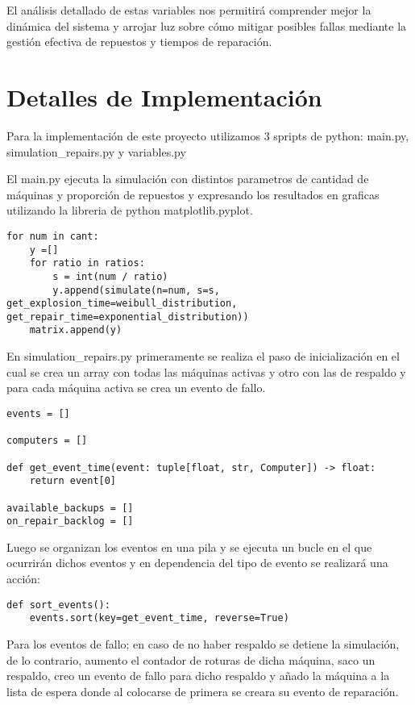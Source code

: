 \documentclass{article}
\begin{document}
 El análisis detallado de estas variables nos permitirá comprender mejor la dinámica del sistema y arrojar luz sobre cómo mitigar posibles fallas mediante la gestión efectiva de repuestos y tiempos de reparación.

\section{Detalles de Implementación}

 Para la implementación de este proyecto utilizamos 3 spripts de python: main.py, simulation\_repairs.py y variables.py

 El main.py ejecuta la simulación con distintos parametros de cantidad de máquinas y proporción de repuestos y expresando los resultados en graficas utilizando la libreria de python matplotlib.pyplot.

\begin{lstlisting}
for num in cant:
    y =[]
    for ratio in ratios:
        s = int(num / ratio)
        y.append(simulate(n=num, s=s, get_explosion_time=weibull_distribution, get_repair_time=exponential_distribution))
    matrix.append(y)
\end{lstlisting}


 En simulation\_repairs.py primeramente se realiza el paso de inicialización en el cual se crea un array con todas las máquinas activas y otro con las de respaldo y para cada máquina activa se crea un evento de fallo.

\begin{lstlisting}
events = []

computers = []

def get_event_time(event: tuple[float, str, Computer]) -> float:
	return event[0]

available_backups = []
on_repair_backlog = []

\end{lstlisting}

 Luego se organizan los eventos en una pila y se ejecuta un bucle en el que ocurrirán dichos eventos y en dependencia del tipo de evento se realizará una acción: 
 
 \begin{lstlisting}
def sort_events():
	events.sort(key=get_event_time, reverse=True)
\end{lstlisting}

 
 Para los eventos de fallo; en caso de no haber respaldo se detiene la simulación, de lo contrario, aumento el contador de roturas de dicha máquina, saco un respaldo, creo un evento de fallo para dicho respaldo y añado la máquina a la lista de espera donde al colocarse de primera se creara su evento de reparación. 
\end{document}
